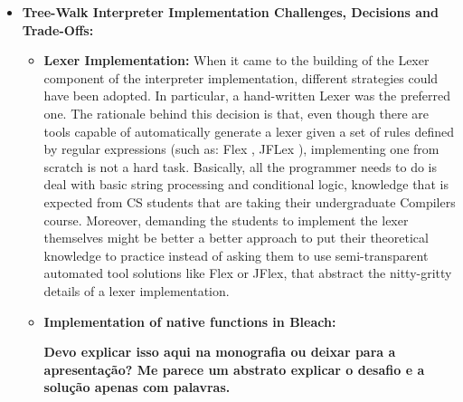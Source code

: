 \begin{itemize}
    \item \textbf{Tree-Walk Interpreter Implementation Challenges, Decisions and Trade-Offs:}
    \begin{itemize}
    
        \item \textbf{Lexer Implementation:} When it came to the building of the Lexer component of the interpreter implementation, different strategies could have been adopted. In particular, a hand-written Lexer was the preferred one. The rationale behind this decision is that, even though there are tools capable of automatically generate a lexer given a set of rules defined by regular expressions (such as: Flex \cite{Flex} \cite{wiki_Flex}, JFLex \cite{klein2010jflex}), implementing one from scratch is not a hard task. Basically, all the programmer needs to do is deal with basic string processing and conditional logic, knowledge that is expected from CS students that are taking their undergraduate Compilers course. Moreover, demanding the students to implement the lexer themselves might be better a better approach to put their theoretical knowledge to practice instead of asking them to use semi-transparent automated tool solutions like Flex or JFlex, that abstract the nitty-gritty details of a lexer implementation.
        
        
        \item \textbf{Implementation of native functions in Bleach:}
        
        \textbf{Devo explicar isso aqui na monografia ou deixar para a apresentação? Me parece um abstrato explicar o desafio e a solução apenas com palavras.}


\end{itemize}
\end{itemize}
